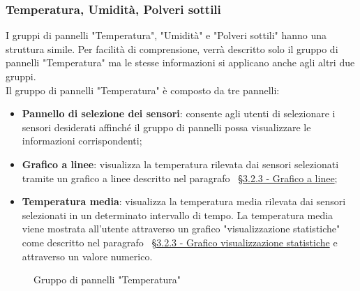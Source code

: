 \subsubsection{Temperatura, Umidità, Polveri sottili}
I gruppi di pannelli "Temperatura", "Umidità" e "Polveri sottili" hanno una struttura simile. Per facilità di comprensione, verrà descritto solo il gruppo di pannelli "Temperatura" ma le stesse informazioni si applicano anche agli altri due gruppi. \\ 
Il gruppo di pannelli "Temperatura" è composto da tre pannelli:
\begin{itemize}
    \item \textbf{Pannello di selezione dei sensori}: consente agli utenti di selezionare i sensori desiderati affinché il gruppo di pannelli possa visualizzare le informazioni corrispondenti;
    \item \textbf{Grafico a linee}: visualizza la temperatura rilevata dai sensori selezionati tramite un grafico a linee descritto nel paragrafo  ~\hyperlink{par:grafico_linee}{\S 3.2.3 - Grafico a linee};
    \item \textbf{Temperatura media}: visualizza la temperatura media rilevata dai sensori selezionati in un determinato intervallo di tempo. La temperatura media viene mostrata all'utente attraverso un grafico "visualizzazione statistiche" come descritto nel paragrafo ~\hyperlink{par:visu_stat}{\S 3.2.3 - Grafico visualizzazione statistiche} e attraverso un valore numerico.
\end{itemize}
\begin{figure}[H]
    \centering
    \caption{Gruppo di pannelli "Temperatura"}
    \label{fig:my_label}
\end{figure}

